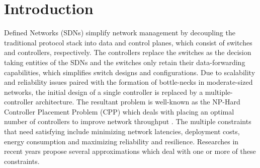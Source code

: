 \documentclass[journal]{IEEEtran}
\begin{document}
\section{Introduction}
 Defined Networks (SDNs) simplify network management by decoupling the traditional protocol stack into data and control planes, which consist of switches and controllers, respectively. The controllers replace the switches as the decision taking entities of the SDNs and the switches only retain their data-forwarding capabilities, which simplifies switch designs and configurations. Due to scalability and reliability issues \cite{scalability2013dixit, scalability2013yeganeh} paired with the formation of bottle-necks in moderate-sized networks, the initial design of a single controller \cite{greene2009tr10} is replaced by a multiple-controller architecture. The resultant problem is well-known as the NP-Hard Controller Placement Problem (CPP) which deals with placing an optimal number of controllers to improve network throughput \cite{cppsurvey2017, cppsurvey2018, sdnsurvey2017}. The multiple constraints that need satisfying include minimizing network latencies, deployment costs, energy consumption and maximizing reliability and resilience. Researches in recent years propose several approximations which deal with one or more of these constraints.
\end{document}
